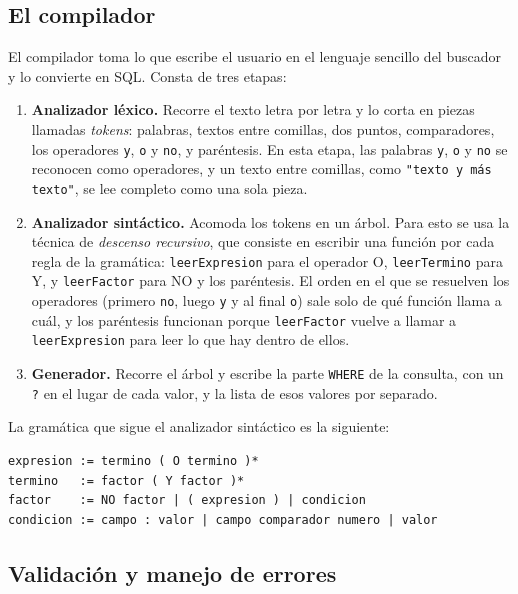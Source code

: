 \documentclass[12pt,letterpaper]{article}
\begin{document}
\subsection{El compilador}

El compilador toma lo que escribe el usuario en el lenguaje sencillo del
buscador y lo convierte en SQL. Consta de tres etapas:

\begin{enumerate}
    \item \textbf{Analizador léxico.} Recorre el texto letra por letra y
          lo corta en piezas llamadas \emph{tokens}: palabras, textos
          entre comillas, dos puntos, comparadores, los operadores
          \texttt{y}, \texttt{o} y \texttt{no}, y paréntesis. En esta
          etapa, las palabras \texttt{y}, \texttt{o} y \texttt{no} se
          reconocen como operadores, y un texto entre comillas, como
          \texttt{"texto y más texto"}, se lee completo como una sola
          pieza.
    \item \textbf{Analizador sintáctico.} Acomoda los tokens en un árbol.
          Para esto se usa la técnica de \emph{descenso recursivo}, que
          consiste en escribir una función por cada regla de la
          gramática: \texttt{leerExpresion} para el operador O,
          \texttt{leerTermino} para Y, y \texttt{leerFactor} para NO y
          los paréntesis. El orden en el que se resuelven los operadores
          (primero \texttt{no}, luego \texttt{y} y al final \texttt{o})
          sale solo de qué función llama a cuál, y los paréntesis
          funcionan porque \texttt{leerFactor} vuelve a llamar a
          \texttt{leerExpresion} para leer lo que hay dentro de ellos.
    \item \textbf{Generador.} Recorre el árbol y escribe la parte
          \texttt{WHERE} de la consulta, con un \texttt{?} en el lugar de
          cada valor, y la lista de esos valores por separado.
\end{enumerate}

La gramática que sigue el analizador sintáctico es la siguiente:

\begin{verbatim}
expresion := termino ( O termino )*
termino   := factor ( Y factor )*
factor    := NO factor | ( expresion ) | condicion
condicion := campo : valor | campo comparador numero | valor
\end{verbatim}

\subsection{Validación y manejo de errores}
\end{document}
